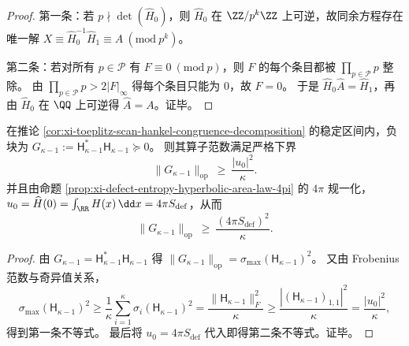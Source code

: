 \begin{proof}
第一条：若 \(p\nmid\det(\widehat H_0)\)，则 \(\widehat H_0\) 在 \(\ZZ/p^k\ZZ\) 上可逆，故同余方程存在唯一解
\(
X\equiv \widehat H_0^{-1}\widehat H_1\equiv A\ (\mathrm{mod}\ p^k)
\)。
\par
第二条：若对所有 \(p\in\mathcal P\) 有 \(F\equiv 0\ (\mathrm{mod}\ p)\)，则 \(F\) 的每个条目都被 \(\prod_{p\in\mathcal P}p\) 整除。
由 \(\prod_{p\in\mathcal P}p>2|F|_\infty\) 得每个条目只能为 \(0\)，故 \(F=0\)。
于是 \(\widehat H_0\widehat A=\widehat H_1\)，再由 \(\widehat H_0\) 在 \(\QQ\) 上可逆得 \(\widehat A=A\)。证毕。
\end{proof}

\begin{corollary}[缺陷熵迫使负块谱质量非退化]\label{cor:xi-defect-entropy-forces-negative-block-mass}
在推论 \ref{cor:xi-toeplitz-scan-hankel-congruence-decomposition} 的稳定区间内，负块为
\(
G_{\kappa-1}:=\mathsf H_{\kappa-1}^\ast\mathsf H_{\kappa-1}\succeq 0
\)。
则其算子范数满足严格下界
\[
\|G_{\kappa-1}\|_{\mathrm{op}}
\ \ge\
\frac{|u_0|^2}{\kappa}.
\]
并且由命题 \ref{prop:xi-defect-entropy-hyperbolic-area-law-4pi} 的 \(4\pi\) 规一化，
\(
u_0=\widehat H(0)=\int_{\RR}H(x)\,\dd x=4\pi S_{\mathrm{def}}
\)，从而
\[
\|G_{\kappa-1}\|_{\mathrm{op}}\ \ge\ \frac{(4\pi S_{\mathrm{def}})^2}{\kappa}.
\]
\end{corollary}
\begin{proof}
由 \(G_{\kappa-1}=\mathsf H_{\kappa-1}^\ast\mathsf H_{\kappa-1}\) 得
\(
\|G_{\kappa-1}\|_{\mathrm{op}}=\sigma_{\max}(\mathsf H_{\kappa-1})^2
\)。
又由 Frobenius 范数与奇异值关系，
\[
\sigma_{\max}(\mathsf H_{\kappa-1})^2
\ge \frac{1}{\kappa}\sum_{i=1}^{\kappa}\sigma_i(\mathsf H_{\kappa-1})^2
=\frac{\|\mathsf H_{\kappa-1}\|_F^2}{\kappa}
\ge \frac{|(\mathsf H_{\kappa-1})_{1,1}|^2}{\kappa}
=\frac{|u_0|^2}{\kappa},
\]
得到第一条不等式。
最后将 \(u_0=4\pi S_{\mathrm{def}}\) 代入即得第二条不等式。证毕。
\end{proof}





\endinput
